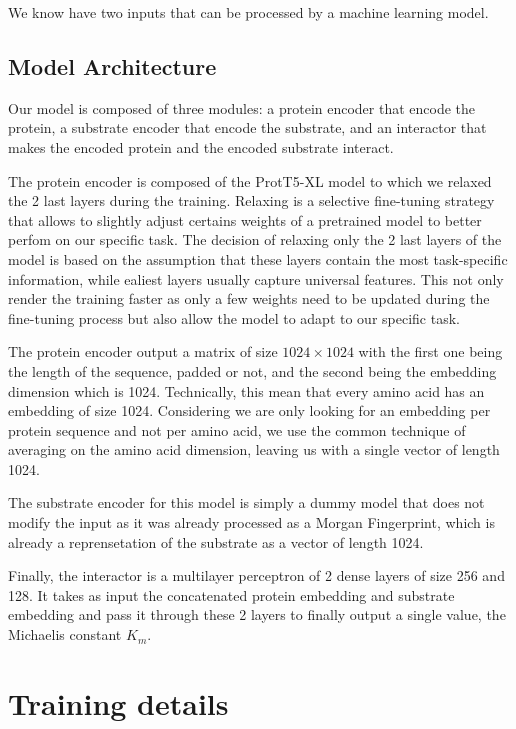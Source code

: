 We know have two inputs that can be processed by a machine learning model.

\subsection{Model Architecture}

Our model is composed of three modules: a protein encoder that encode the protein, a substrate encoder that
encode the substrate, and an interactor that makes the encoded protein and the encoded substrate interact.

The protein encoder is composed of the ProtT5-XL model to which we relaxed the 2 last layers during the training.
Relaxing is a selective fine-tuning strategy that allows to slightly adjust certains weights of a pretrained model 
to better perfom on our specific task. The decision of relaxing only the 2 last layers of the model is based on
the assumption that these layers contain the most task-specific information, while ealiest layers usually capture
universal features. This not only render the training faster as only a few weights need to be updated during the
fine-tuning process but also allow the model to adapt to our specific task.

The protein encoder output a matrix of size $1024\times 1024$ with the first one being the length of the sequence,
padded or not, and the second being the embedding dimension which is 1024. Technically, this mean that every
amino acid has an embedding of size 1024. Considering we are only looking for an embedding per protein sequence
and not per amino acid, we use the common technique of averaging on the amino acid dimension, leaving us with a
single vector of length 1024.

The substrate encoder for this model is simply a dummy model that does not modify the input as it was already
processed as a Morgan Fingerprint, which is already a reprensetation of the substrate as a vector of length 1024.

Finally, the interactor is a multilayer perceptron of 2 dense layers of size 256 and 128. It takes as input the
concatenated protein embedding and substrate embedding and pass it through these 2 layers to finally output a single
value, the Michaelis constant $K_m$.

\section{Training details}

